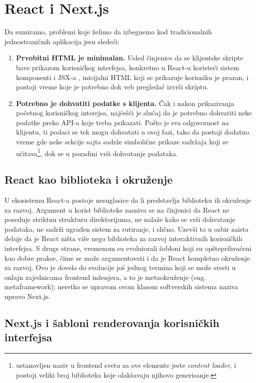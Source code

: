 \documentclass[12pt,oneside]{memoir}
\begin{document}
\newpage
\section{React i Next.js}
Da sumiramo, problemi koje želimo da izbegnemo kod tradicionalnih jednostraničnih aplikacija jesu sledeći:
\begin{enumerate}
    \item \textbf{Prvobitni HTML je minimalan.} Usled činjenice da se klijentske skripte bave prikazom korisničkog interfejsa, konkretno u React-u koristeći sistem komponenti i JSX-a \cite{reactdocscomponents}, inicijalni HTML koji se prikazuje korisniku je prazan, i postoji vreme koje je potrebno dok veb pregledač izvrši skriptu.
    \item \textbf{Potrebno je dohvatiti podatke s klijenta.} Čak i nakon prikazivanja početnog korisničkog interejsa, najčešći je slučaj da je potrebno dohvatiti neke podatke preko API-a koje treba prikazati. Pošto je sva odgovornost na klijentu, ti podaci se tek mogu dohvatati u ovoj fazi, tako da postoji dodatno vreme gde neke sekcije sajta sadrže simbolične prikaze sadržaja koji se učitava\footnote{ustanovljen naziv u frontend svetu za ove elemente jeste \textit{content loader}, i postoji veliki broj biblioteka koje olakšavaju njihovo generisanje.}, dok se u pozadini vrši dohvatanje podataka.
\end{enumerate}

\subsection{React kao biblioteka i okruženje}

U ekosistemu React-a postoje nesuglasice da li predstavlja biblioteku ili okruženje za razvoj. Argument u korist biblioteke zasniva se na činjenici da React ne poseduje striktnu strukturu direktorijuma, ne nalaže kako se vrši dohvatanje podataka, ne sadrži ugrađen sistem za rutiranje, i slično. Uzevši to u ozbir zaista deluje da je React ništa više nego biblioteka za razvoj interaktivnih korisničkih interfejsa. S druge strane, vremenom su evoluiorali šabloni koji su opšteprihvaćeni kao dobre prakse, čime se može argumentovati i da je React kompletno okruženje za razvoj. Ovo je dovelo do evolucije još jednog termina koji se može sresti u onlajn zajednicama frontend inženjera, a to je metaokruženje (eng. metaframework); neretko se upravom ovom klasom softverskih sistema naziva upravo Next.js.

\subsection{Next.js i šabloni renderovanja korisničkih interfejsa}
\end{document}
